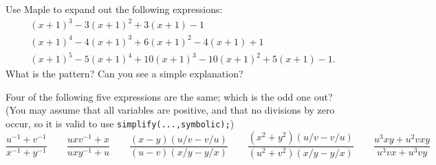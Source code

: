 \documentclass[a4paper,10pt]{amsbook}
\begin{document}
\begin{exercise}\label{ex-expand-unshift}
 Use Maple to expand out the following expressions:
 \begin{align*}
  & (x+1)^3 - 3(x+1)^2 + 3(x+1) - 1 \\
  & (x+1)^4 - 4(x+1)^3 + 6(x+1)^2 - 4(x+1) + 1 \\
  & (x+1)^5 - 5(x+1)^4 + 10(x+1)^3 - 10(x+1)^2 + 5(x+1) - 1.
 \end{align*}
 What is the pattern?  Can you see a simple explanation?
\end{exercise}

\begin{exercise}\label{ex-oddone}
 Four of the following five expressions are the same; which is the odd
 one out?  (You may assume that all variables are positive, and that no
 divisions by zero occur, so it is valid to use
 \verb+simplify(...,symbolic);+)
 \[ 
  \frac{u^{-1}+v^{-1}}{x^{-1}+y^{-1}}            \hspace{2em}
  \frac{uxv^{-1} + x}{uxy^{-1} + u}              \hspace{2em}
  \frac{(x-y)(u/v-v/u)}{(u-v)(x/y-y/x)}          \hspace{2em}
  \frac{(x^2+y^2)(u/v-v/u)}{(u^2+v^2)(x/y-y/x)}  \hspace{2em}
  \frac{u^3xy+u^2vxy}{u^3vx+u^3vy}
 \]
\end{exercise}
\end{document}
